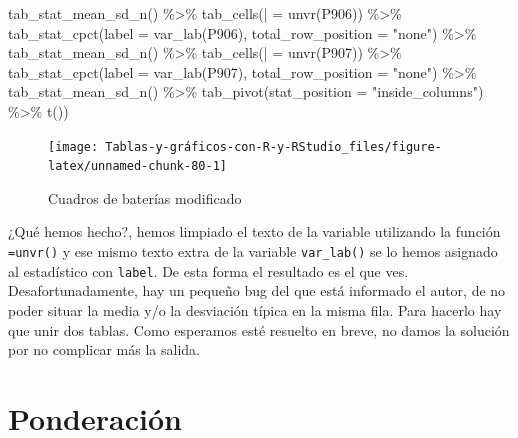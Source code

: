 \documentclass[
]{book}
\newenvironment{Shaded}{\begin{snugshade}}{\end{snugshade}}
\newcommand{\AttributeTok}[1]{\textcolor[rgb]{0.77,0.63,0.00}{#1}}
\newcommand{\FunctionTok}[1]{\textcolor[rgb]{0.00,0.00,0.00}{#1}}
\newcommand{\NormalTok}[1]{#1}
\newcommand{\OtherTok}[1]{\textcolor[rgb]{0.56,0.35,0.01}{#1}}
\newcommand{\SpecialCharTok}[1]{\textcolor[rgb]{0.00,0.00,0.00}{#1}}
\newcommand{\StringTok}[1]{\textcolor[rgb]{0.31,0.60,0.02}{#1}}
\begin{document}
\begin{Shaded}
\begin{Highlighting}[]
  \FunctionTok{tab\_stat\_mean\_sd\_n}\NormalTok{() }\SpecialCharTok{\%\textgreater{}\%} \FunctionTok{tab\_cells}\NormalTok{(}\StringTok{\textasciigrave{}}\AttributeTok{|}\StringTok{\textasciigrave{}} \OtherTok{=} \FunctionTok{unvr}\NormalTok{(P906)) }\SpecialCharTok{\%\textgreater{}\%} 
  \FunctionTok{tab\_stat\_cpct}\NormalTok{(}\AttributeTok{label =} \FunctionTok{var\_lab}\NormalTok{(P906), }\AttributeTok{total\_row\_position =} \StringTok{"none"}\NormalTok{) }\SpecialCharTok{\%\textgreater{}\%} 
  \FunctionTok{tab\_stat\_mean\_sd\_n}\NormalTok{() }\SpecialCharTok{\%\textgreater{}\%} \FunctionTok{tab\_cells}\NormalTok{(}\StringTok{\textasciigrave{}}\AttributeTok{|}\StringTok{\textasciigrave{}} \OtherTok{=} \FunctionTok{unvr}\NormalTok{(P907)) }\SpecialCharTok{\%\textgreater{}\%} 
  \FunctionTok{tab\_stat\_cpct}\NormalTok{(}\AttributeTok{label =} \FunctionTok{var\_lab}\NormalTok{(P907), }\AttributeTok{total\_row\_position =} \StringTok{"none"}\NormalTok{) }\SpecialCharTok{\%\textgreater{}\%} 
  \FunctionTok{tab\_stat\_mean\_sd\_n}\NormalTok{() }\SpecialCharTok{\%\textgreater{}\%} \FunctionTok{tab\_pivot}\NormalTok{(}\AttributeTok{stat\_position =} \StringTok{"inside\_columns"}\NormalTok{) }\SpecialCharTok{\%\textgreater{}\%} 
  \FunctionTok{t}\NormalTok{())}
\end{Highlighting}
\end{Shaded}

\begin{figure}[H]

{\centering \texttt{[image: Tablas-y-gráficos-con-R-y-RStudio\_files/figure-latex/unnamed-chunk-80-1]} 

}

\caption{Cuadros de baterías modificado}\label{fig:unnamed-chunk-80}
\end{figure}

¿Qué hemos hecho?, hemos limpiado el texto de la variable utilizando la función \texttt{\textquotesingle{}\textbar{}\textquotesingle{}=unvr()} y ese mismo texto extra de la variable \texttt{var\_lab()} se lo hemos asignado al estadístico con \texttt{label}. De esta forma el resultado es el que ves. Desafortunadamente, hay un pequeño bug del que está informado el autor, de no poder situar la media y/o la desviación típica en la misma fila. Para hacerlo hay que unir dos tablas. Como esperamos esté resuelto en breve, no damos la solución por no complicar más la salida.

\hypertarget{ponderaciuxf3n}{%
\section{Ponderación}\label{ponderaciuxf3n}}
\end{document}
